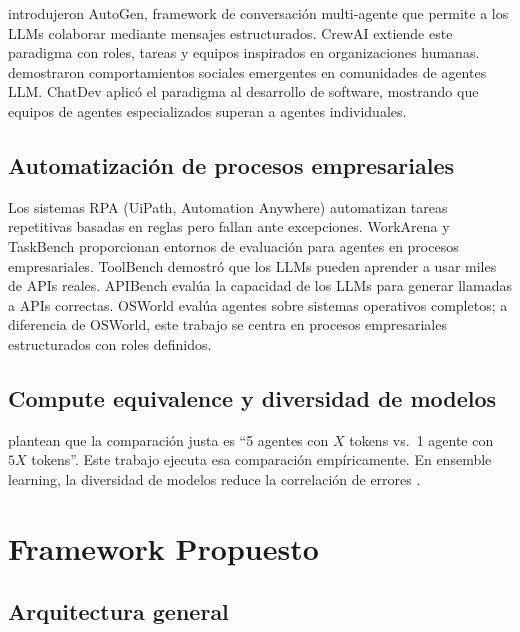\documentclass[preprint,12pt,authoryear]{elsarticle}
\begin{document}
\citet{wu2023autogen} introdujeron AutoGen, framework de conversaci\'on
multi-agente que permite a los LLMs colaborar mediante mensajes estructurados.
CrewAI \citep{crewai2024} extiende este paradigma con roles, tareas y equipos
inspirados en organizaciones humanas.
\citet{park2023generative} demostraron comportamientos sociales emergentes en
comunidades de agentes LLM.
ChatDev \citep{qian2023chatdev} aplic\'o el paradigma al desarrollo de software,
mostrando que equipos de agentes especializados superan a agentes individuales.

\subsection{Automatizaci\'on de procesos empresariales}

Los sistemas RPA (UiPath, Automation Anywhere) automatizan tareas repetitivas
basadas en reglas pero fallan ante excepciones.
WorkArena \citep{drouin2024workarena} y TaskBench \citep{lu2023taskbench}
proporcionan entornos de evaluaci\'on para agentes en procesos empresariales.
ToolBench \citep{qin2023toolllm} demostr\'o que los LLMs pueden aprender a
usar miles de APIs reales.
APIBench \citep{patil2023gorilla} eval\'ua la capacidad de los LLMs para
generar llamadas a APIs correctas.
OSWorld \citep{xie2024osworld} eval\'ua agentes sobre sistemas operativos
completos; a diferencia de OSWorld, este trabajo se centra en procesos
empresariales estructurados con roles definidos.

\subsection{Compute equivalence y diversidad de modelos}

\citet{wu2023autogen} plantean que la comparaci\'on justa es ``5 agentes con
$X$ tokens vs.\ 1 agente con $5X$ tokens''.
Este trabajo ejecuta esa comparaci\'on emp\'iricamente.
En ensemble learning, la diversidad de modelos reduce la correlaci\'on de
errores \citep{dietterich2000ensemble}.

\section{Framework Propuesto}
\label{sec:framework}

\subsection{Arquitectura general}
\end{document}
